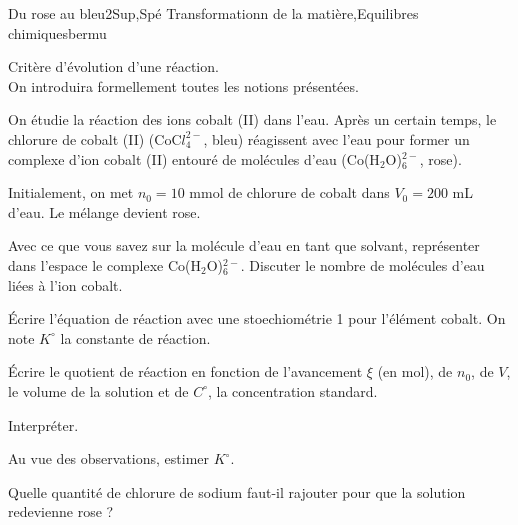 
\begin{exercise}{Du rose au bleu}{2}{Sup,Spé}
{Transformationn de la matière,Equilibres chimiques}{bermu}

\begin{questions}
\questioncours Critère d'évolution d'une réaction. \\
On introduira formellement toutes les notions présentées.

\begin{EnvUplevel}
     On étudie la réaction des ions cobalt (II) dans l'eau. Après un certain temps, le chlorure de cobalt (II) (CoC$l_4^{2-}$, bleu) réagissent avec l'eau pour former un complexe d'ion cobalt (II) entouré de molécules d'eau (Co(H$_2$O)$_6^{2-}$, rose).
     
     Initialement, on met $n_0 = 10$ mmol de chlorure de cobalt dans $V_0 = 200$ mL d'eau. Le mélange devient rose.
\end{EnvUplevel}

\question Avec ce que vous savez sur la molécule d'eau en tant que solvant, représenter dans l'espace le complexe Co(H$_2$O)$_6^{2-}$. Discuter le nombre de molécules d'eau liées à l'ion cobalt.

\question \'Ecrire l'équation de réaction avec une stoechiométrie 1 pour l'élément cobalt. On note $K^\circ$ la constante de réaction.

\question \'Ecrire le quotient de réaction en fonction de l'avancement $\xi$ (en mol), de $n_0$, de $V$, le volume de la solution et de $C^\circ$, la concentration standard.


\question Interpréter.

\question Au vue des observations, estimer $K^\circ$.

\question Quelle quantité de chlorure de sodium faut-il rajouter pour que la solution redevienne rose ?

\end{questions}

\end{exercise}


